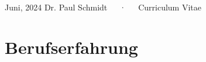 \documentclass[11pt,a4paper,]{awesome-cv}
\begin{document}
\makecvheader

\makecvfooter
  {Juni, 2024}
    {Dr. Paul Schmidt~~~·~~~Curriculum Vitae}
  {\thepage}






\section{Berufserfahrung}\label{berufserfahrung}
\end{document}
